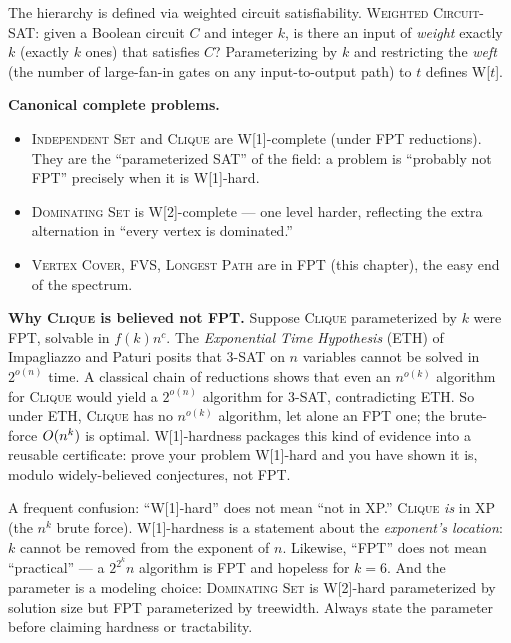 The hierarchy is defined via weighted circuit satisfiability. \textsc{Weighted Circuit-SAT}: given a Boolean circuit $C$ and integer $k$, is there an input of \emph{weight} exactly $k$ (exactly $k$ ones) that satisfies $C$? Parameterizing by $k$ and restricting the \emph{weft} (the number of large-fan-in gates on any input-to-output path) to $t$ defines W[$t$].

\begin{focusbox}
\textbf{Canonical complete problems.}
\begin{itemize}
  \item \textsc{Independent Set} and \textsc{Clique} are W[1]-complete (under FPT reductions). They are the ``parameterized SAT'' of the field: a problem is ``probably not FPT'' precisely when it is W[1]-hard.
  \item \textsc{Dominating Set} is W[2]-complete --- one level harder, reflecting the extra alternation in ``every vertex is dominated.''
  \item \textsc{Vertex Cover}, \textsc{FVS}, \textsc{Longest Path} are in FPT (this chapter), the easy end of the spectrum.
\end{itemize}
\end{focusbox}

\begin{whybox}
\textbf{Why \textsc{Clique} is believed not FPT.} Suppose \textsc{Clique} parameterized by $k$ were FPT, solvable in $f(k)n^c$. The \emph{Exponential Time Hypothesis} (ETH) of Impagliazzo and Paturi posits that $3$-SAT on $n$ variables cannot be solved in $2^{o(n)}$ time. A classical chain of reductions shows that even an $n^{o(k)}$ algorithm for \textsc{Clique} would yield a $2^{o(n)}$ algorithm for $3$-SAT, contradicting ETH. So under ETH, \textsc{Clique} has no $n^{o(k)}$ algorithm, let alone an FPT one; the brute-force $O(n^k)$ is optimal. W[1]-hardness packages this kind of evidence into a reusable certificate: prove your problem W[1]-hard and you have shown it is, modulo widely-believed conjectures, not FPT.
\end{whybox}

\begin{trapbox}
A frequent confusion: ``W[1]-hard'' does not mean ``not in XP.'' \textsc{Clique} \emph{is} in XP (the $n^k$ brute force). W[1]-hardness is a statement about the \emph{exponent's location}: $k$ cannot be removed from the exponent of $n$. Likewise, ``FPT'' does not mean ``practical'' --- a $2^{2^k}n$ algorithm is FPT and hopeless for $k=6$. And the parameter is a modeling choice: \textsc{Dominating Set} is W[2]-hard parameterized by solution size but FPT parameterized by treewidth. Always state the parameter before claiming hardness or tractability.
\end{trapbox}

